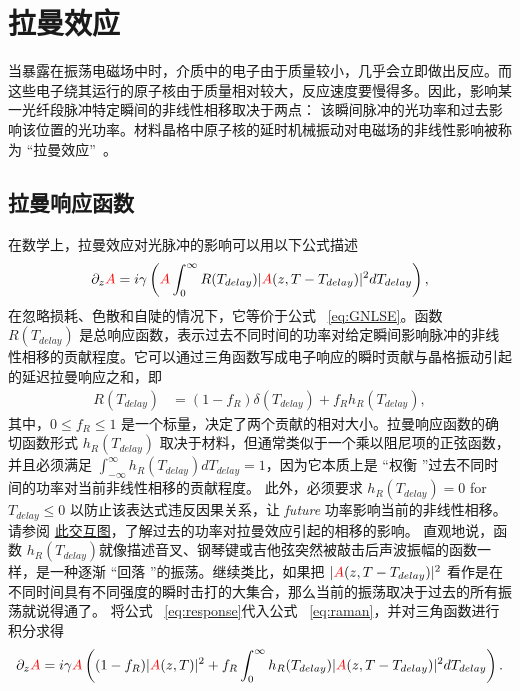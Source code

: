 \chapter{拉曼效应}
\label{ch:Raman}

当暴露在振荡电磁场中时，介质中的电子由于质量较小，几乎会立即做出反应。而这些电子绕其运行的原子核由于质量相对较大，反应速度要慢得多。因此，影响某一光纤段脉冲特定瞬间的非线性相移取决于两点： 该瞬间脉冲的光功率和过去影响该位置的光功率。材料晶格中原子核的延时机械振动对电磁场的非线性影响被称为 “拉曼效应”~\cite{Raman_original}。 


\section{拉曼响应函数}
在数学上，拉曼效应对光脉冲的影响可以用以下公式描述
\begin{align}
\label{eq:raman}
 \partial_z \textcolor{red}{A} = i\gamma\left( 
\textcolor{red}{A} \int_{0}^{\infty} R(T_{delay})|\textcolor{red}{A}(z,T-T_{delay})|^2 dT_{delay} \right),
\end{align}
在忽略损耗、色散和自陡的情况下，它等价于公式 ~\ref{eq:GNLSE}。函数 $R(T_{delay})$ 是总响应函数，表示过去不同时间的功率对给定瞬间影响脉冲的非线性相移的贡献程度。它可以通过三角函数写成电子响应的瞬时贡献与晶格振动引起的延迟拉曼响应之和，即
\begin{align}
    \label{eq:response}
    R(T_{delay})&= (1-f_R)\delta(T_{delay})+f_Rh_R(T_{delay}),
\end{align}
其中，$0\leq f_R\leq 1$ 是一个标量，决定了两个贡献的相对大小。拉曼响应函数的确切函数形式 $h_R(T_{delay})$ 取决于材料，但通常类似于一个乘以阻尼项的正弦函数，并且必须满足 $\int_{-\infty}^{\infty}h_R(T_{delay}) dT_{delay}=1$，因为它本质上是 “权衡 ”过去不同时间的功率对当前非线性相移的贡献程度。 此外，必须要求 $h_R(T_{delay})=0$ for $T_{delay}\leq0$ 以防止该表达式违反因果关系，让 \emph{future} 功率影响当前的非线性相移。请参阅 \href{https://www.desmos.com/calculator/bdg6icprch}{此交互图}，了解过去的功率对拉曼效应引起的相移的影响。
直观地说，函数 $h_R(T_{delay})$就像描述音叉、钢琴键或吉他弦突然被敲击后声波振幅的函数一样，是一种逐渐 “回落 ”的振荡。继续类比，如果把 $|\textcolor{red}{A}(z,T-T_{delay})|^2$ 看作是在不同时间具有不同强度的瞬时击打的大集合，那么当前的振荡取决于过去的所有振荡就说得通了。 
将公式 ~\ref{eq:response}代入公式 ~\ref{eq:raman}，并对三角函数进行积分求得
\begin{align}
    \label{eq:raman_split}
    \partial_z \textcolor{red}{A} = i\gamma\textcolor{red}{A}\left( 
(1-f_R)|\textcolor{red}{A}(z,T)|^2+f_R \int_{0}^{\infty} h_R(T_{delay})|\textcolor{red}{A}(z,T-T_{delay})|^2 dT_{delay} \right).
\end{align}
